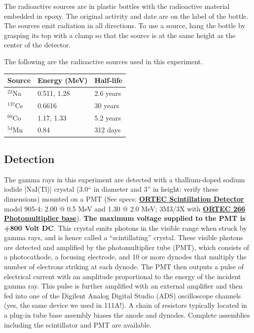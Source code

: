 \documentclass{../lab}
\begin{document}
The radioactive sources are in plastic bottles with the radioactive material embedded in epoxy. The original activity and date are on the label of the bottle. The sources emit radiation in all directions. To use a source, hang the bottle by grasping its top with a clamp so that the source is at the same height as the center of the detector.

The following are the radioactive sources used in this experiment.

\begin{center}
    \begin{tabular}{l|l|l}
        Source     & Energy (MeV) & Half-life \\\hline
        $^{22}$Na  &  0.511, 1.28 & 2.6 years \\\hline
        $^{137}$Cs &  0.6616      & 30 years  \\\hline
        $^{60}$Co  &  1.17, 1.33  & 5.2 years \\\hline
        $^{54}$Mn  &  0.84        & 312 days
    \end{tabular}
\end{center}

\subsection{Detection}
The gamma rays in this experiment are detected with a thallium-doped sodium iodide [NaI(Tl)] crystal (3.0`` in diameter and 3'' in height: verify these dimensions) mounted on a PMT (See specs: \href{https://drive.google.com/file/d/1Hf_LmTA6Bq4PDPHpI3Ux3wmfe61OZqrJ/view?usp=drive_link}{\textbf{ORTEC Scintillation Detector}} model 905-4: 2.00 @ 0.5 MeV and 1.30 @ 2.0 MeV; 3M3/3X with \href{https://drive.google.com/file/d/1w2nM4xpDyLj5RCMfyUWVf7PMapEULrlQ/view?usp=drive_link}{\textbf{ORTEC 266 Photomultiplier base}}). \textbf{The maximum voltage supplied to the PMT is +800 Volt DC}. This crystal emits photons in the visible range when struck by gamma rays, and is hence called a ``scintillating'' crystal. These visible photons are detected and amplified by the photomultiplier tube (PMT), which consists of a photocathode, a focusing electrode, and 10 or more dynodes that multiply the number of electrons striking at each dynode. The PMT then outputs a pulse of electrical current with an amplitude proportional to the energy of the incident gamma ray. This pulse is further amplified with an external amplifier and then fed into one of the Digilent Analog Digital Studio (ADS) oscilloscope channels (yes, the same device we used in 111A!). %
A chain of resistors typically located in a plug-in tube base assembly biases the anode and dynodes. Complete assemblies including the scintillator and PMT are available. 
\end{document}
